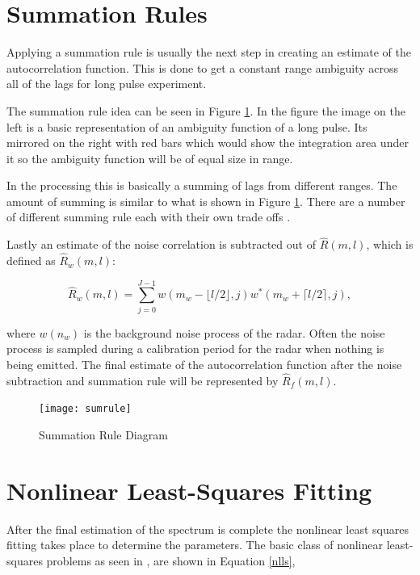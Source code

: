 \documentclass[10pt]{report}
\begin{document}
\section{Summation Rules}
Applying a summation rule is usually the next step in creating an estimate of the autocorrelation function.  This is done to get a constant range ambiguity across all of the lags for long pulse experiment\cite{nygren1996}. 

The summation rule idea can be seen in Figure \ref{fig:sumrule}.  In the figure the image on the left is a basic representation of an ambiguity function of a long pulse.  Its mirrored on the right with red bars which would show the integration area under it so the ambiguity function will be of equal size in range.  

In the processing this is basically a summing of lags from different ranges.  The amount of summing is similar to what is shown in Figure \ref{fig:sumrule}.  There are a number of different summing rule each with their own trade offs \cite{nygren1996}.  

Lastly an estimate of the noise correlation is subtracted out of $\hat{R}(m,l)$, which is defined as $\hat{R}_w(m,l)$:

\begin{equation}
\label{lagpro}
\hat{R}_w(m,l) = \displaystyle\sum\limits_{j=0}^{J-1} w(m_w-\lfloor l/2\rfloor,j)w^*(m_w+\lceil l/2 \rceil,j),
\end{equation}

\noindent where $w(n_w)$ is the background noise process of the radar.  Often the noise process is sampled during a calibration period for the radar when nothing is being emitted.  The final estimate of the autocorrelation function after the noise subtraction and summation rule will be represented by $\hat{R}_f(m,l)$.
\begin{figure}[!t]
\centering
\texttt{[image: sumrule]}
\caption{Summation Rule Diagram}
\label{fig:sumrule}
\end{figure}

\section{Nonlinear Least-Squares Fitting}
After the final estimation of the spectrum is complete the nonlinear least squares fitting takes place to determine the parameters.  The basic class of nonlinear least-squares problems as seen in \cite{kayvol1}, are shown in Equation \ref{nlls},
\end{document}
